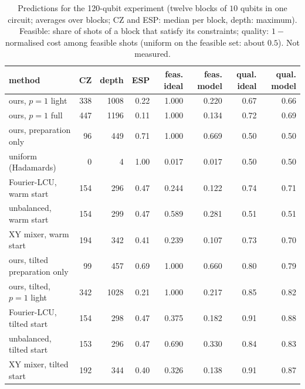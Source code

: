 \begin{table}[t]\centering\small
\caption{ Predictions for the 120-qubit experiment (twelve blocks of $10$ qubits in one circuit; averages over blocks; CZ and ESP: median per block, depth: maximum). Feasible: share of shots of a block that satisfy its constraints; quality: $1-$normalised cost among feasible shots (uniform on the feasible set: about $0.5$). Not measured.}\label{tab:hw100_pred}
\begin{tabular}{lrrrrrrr}\toprule
method & CZ & depth & ESP & feas. ideal & feas. model & qual. ideal & qual. model\\\midrule
ours, $p{=}1$ light & 338 & 1008 & 0.22 & 1.000 & 0.220 & 0.67 & 0.66\\
ours, $p{=}1$ full & 447 & 1196 & 0.11 & 1.000 & 0.134 & 0.72 & 0.69\\
ours, preparation only & 96 & 449 & 0.71 & 1.000 & 0.669 & 0.50 & 0.50\\
uniform (Hadamards) & 0 & 4 & 1.00 & 0.017 & 0.017 & 0.50 & 0.50\\
Fourier-LCU, warm start & 154 & 296 & 0.47 & 0.244 & 0.122 & 0.74 & 0.71\\
unbalanced, warm start & 154 & 299 & 0.47 & 0.589 & 0.281 & 0.51 & 0.51\\
XY mixer, warm start & 194 & 342 & 0.41 & 0.239 & 0.107 & 0.73 & 0.70\\
ours, tilted preparation only & 99 & 457 & 0.69 & 1.000 & 0.660 & 0.80 & 0.79\\
ours, tilted, $p{=}1$ light & 342 & 1028 & 0.21 & 1.000 & 0.217 & 0.85 & 0.82\\
Fourier-LCU, tilted start & 154 & 298 & 0.47 & 0.375 & 0.182 & 0.91 & 0.88\\
unbalanced, tilted start & 153 & 296 & 0.47 & 0.690 & 0.330 & 0.84 & 0.83\\
XY mixer, tilted start & 192 & 344 & 0.40 & 0.326 & 0.138 & 0.91 & 0.87\\
\bottomrule\end{tabular}\end{table}
